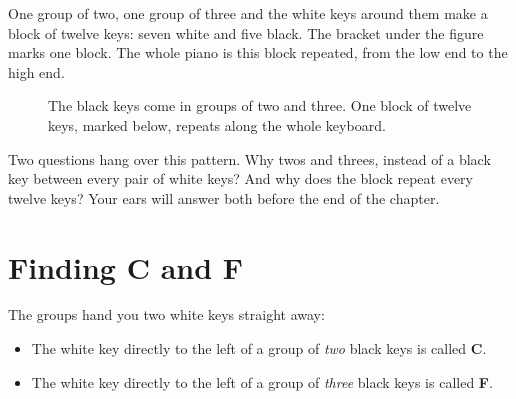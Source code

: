 One group of two, one group of three and the white keys around them make a block of twelve keys: seven white and five black. The bracket under the figure marks one block. The whole piano is this block repeated, from the low end to the high end.

\begin{figure}[htbp]
\centering
{}
\caption{The black keys come in groups of two and three. One block of twelve keys, marked below, repeats along the whole keyboard.}
\label{fig:black-groups}
\end{figure}

Two questions hang over this pattern. Why twos and threes, instead of a black key between every pair of white keys? And why does the block repeat every twelve keys? Your ears will answer both before the end of the chapter.

\section{Finding C and F}

The groups hand you two white keys straight away:
\begin{itemize}
  \item The white key directly to the left of a group of \emph{two} black keys is called \textbf{C}.
  \item The white key directly to the left of a group of \emph{three} black keys is called \textbf{F}.
\end{itemize}

